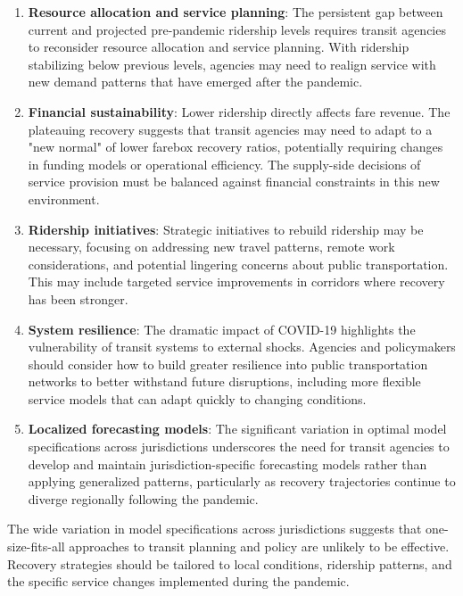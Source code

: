 \documentclass[11pt]{article}
\begin{document}
\begin{enumerate}
\item \textbf{Resource allocation and service planning}: The persistent gap between current and projected pre-pandemic ridership levels requires transit agencies to reconsider resource allocation and service planning. With ridership stabilizing below previous levels, agencies may need to realign service with new demand patterns that have emerged after the pandemic.

\item \textbf{Financial sustainability}: Lower ridership directly affects fare revenue. The plateauing recovery suggests that transit agencies may need to adapt to a "new normal" of lower farebox recovery ratios, potentially requiring changes in funding models or operational efficiency. The supply-side decisions of service provision must be balanced against financial constraints in this new environment.

\item \textbf{Ridership initiatives}: Strategic initiatives to rebuild ridership may be necessary, focusing on addressing new travel patterns, remote work considerations, and potential lingering concerns about public transportation. This may include targeted service improvements in corridors where recovery has been stronger.

\item \textbf{System resilience}: The dramatic impact of COVID-19 highlights the vulnerability of transit systems to external shocks. Agencies and policymakers should consider how to build greater resilience into public transportation networks to better withstand future disruptions, including more flexible service models that can adapt quickly to changing conditions.

\item \textbf{Localized forecasting models}: The significant variation in optimal model specifications across jurisdictions underscores the need for transit agencies to develop and maintain jurisdiction-specific forecasting models rather than applying generalized patterns, particularly as recovery trajectories continue to diverge regionally following the pandemic.
\end{enumerate}

The wide variation in model specifications across jurisdictions suggests that one-size-fits-all approaches to transit planning and policy are unlikely to be effective. Recovery strategies should be tailored to local conditions, ridership patterns, and the specific service changes implemented during the pandemic.
\end{document}
